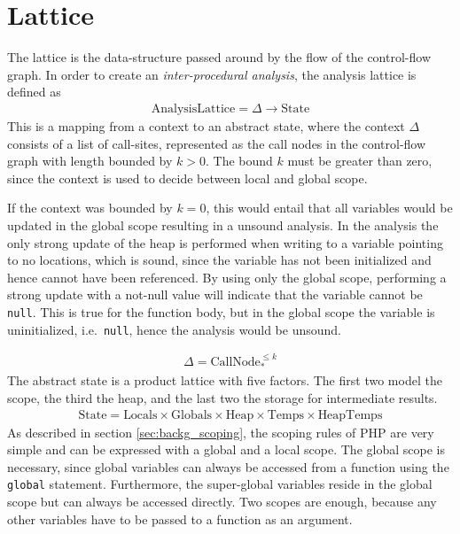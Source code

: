 \section{Lattice}
\label{sec:lattice}

The lattice is the data-structure passed around by the flow of the control-flow graph. In order to create an \emph{inter-procedural analysis}, the analysis lattice is defined as
\begin{align}
\text{AnalysisLattice} = \Delta \rightarrow \text{State}
\end{align}
This is a mapping from a context to an abstract state, where the context $\Delta$ consists of a list of call-sites, represented as the call nodes in the control-flow graph with length bounded by $k>0$. The bound $k$ must be greater than zero, since the context is used to decide between local and global scope. 

If the context was bounded by $k=0$, this would entail that all variables would be updated in the global scope resulting in a unsound analysis. In the analysis the only strong update of the heap is performed when writing to a variable pointing to no locations, which is sound, since the variable has not been initialized and hence cannot have been referenced. By using only the global scope, performing a strong update with a not-null value will indicate that the variable cannot be \texttt{null}. This is true for the function body, but in the global scope the variable is uninitialized, i.e.\ \texttt{null}, hence the analysis would be unsound.

\begin{align}
\Delta = \text{CallNode}_*^{\leq k}
\end{align}
The abstract state is a product lattice with five factors. The first two model the scope, the third the heap, and the last two the storage for intermediate results. 
\begin{align}
\text{State} = \text{Locals} \times \text{Globals} \times \text{Heap} \times \text{Temps} \times \text{HeapTemps} 
\end{align}
As described in section \ref{sec:backg_scoping}, the scoping rules of PHP are very simple and can be expressed with a global and a local scope. The global scope is necessary, since global variables can always be accessed from a function using the \texttt{global} statement. Furthermore, the super-global variables reside in the global scope but can always be accessed directly. Two scopes are enough, because any other variables have to be passed to a function as an argument.

